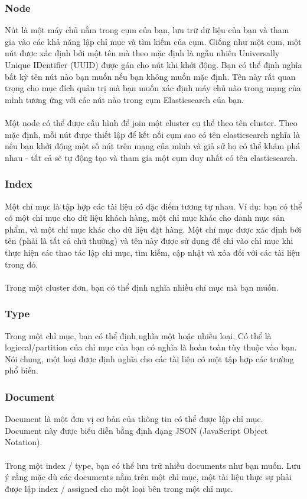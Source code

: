 \documentclass[a4paper,12pt]{report}
\begin{document}
\subsubsection*{Node}
Nút là một máy chủ nằm trong cụm của bạn, lưu trữ dữ liệu của bạn và tham gia vào các khả năng lập chỉ mục và tìm kiếm của cụm. Giống như một cụm, một nút được xác định bởi một tên mà theo mặc định là ngẫu nhiên Universally Unique IDentifier (UUID) được gán cho nút khi khởi động. Bạn có thể định nghĩa bất kỳ tên nút nào bạn muốn nếu bạn không muốn mặc định. Tên này rất quan trọng cho mục đích quản trị mà bạn muốn xác định máy chủ nào trong mạng của mình tương ứng với các nút nào trong cụm Elasticsearch của bạn. \\ \\
Một node có thể được cấu hình để join một cluster cụ thể theo tên cluster. Theo mặc định, mỗi nút được thiết lập để kết nối cụm sao có tên elasticsearch nghĩa là nếu bạn khởi động một số nút trên mạng của mình và giả sử họ có thể khám phá nhau - tất cả sẽ tự động tạo và tham gia một cụm duy nhất có tên elasticsearch.
\subsubsection*{Index}
Một chỉ mục là tập hợp các tài liệu có đặc điểm tương tự nhau. Ví dụ: bạn có thể có một chỉ mục cho dữ liệu khách hàng, một chỉ mục khác cho danh mục sản phẩm, và một chỉ mục khác cho dữ liệu đặt hàng. Một chỉ mục được xác định bởi tên (phải là tất cả chữ thường) và tên này được sử dụng để chỉ vào chỉ mục khi thực hiện các thao tác lập chỉ mục, tìm kiếm, cập nhật và xóa đối với các tài liệu trong đó. \\ \\
Trong một cluster đơn, bạn có thể định nghĩa nhiều chỉ mục mà bạn muốn.
\subsubsection*{Type}
Trong một chỉ mục, bạn có thể định nghĩa một hoặc nhiều loại. Có thể là logiccal/partition của chỉ mục của bạn có  nghĩa là hoàn toàn tùy thuộc vào bạn. Nói chung, một loại được định nghĩa cho các tài liệu có một tập hợp các trường phổ biến.
\subsubsection*{Document}
Document là một đơn vị cơ bản của thông tin có thể được lập chỉ mục. Document này được biểu diễn bằng định dạng JSON (JavaScript Object Notation). \\ \\
Trong một index / type, bạn có thể lưu trữ nhiều documents như bạn muốn. Lưu ý rằng mặc dù các documents nằm trên một chỉ mục, một tài liệu thực sự phải được lập index / assigned cho một loại bên trong một chỉ mục.
\end{document}
